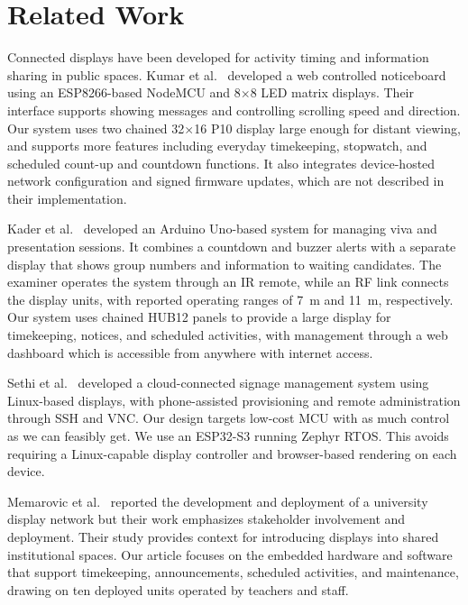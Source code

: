 \section{Related Work}
\label{sec:related_work}

Connected displays have been developed for activity timing and information sharing in public spaces. Kumar et al.~\cite{kumar2023noticeboard} developed a web controlled noticeboard using an ESP8266-based NodeMCU and 8$\times$8 LED matrix displays. Their interface supports showing messages and controlling scrolling speed and direction. Our system uses two chained 32$\times$16 P10 display large enough for distant viewing, and supports more features including everyday timekeeping, stopwatch, and scheduled count-up and countdown functions. It also integrates device-hosted network configuration and signed firmware updates, which are not described in their implementation.

Kader et al.~\cite{kader2019timing} developed an Arduino Uno-based system for managing viva and presentation sessions. It combines a countdown and buzzer alerts with a separate display that shows group numbers and information to waiting candidates. The examiner operates the system through an IR remote, while an RF link connects the display units, with reported operating ranges of 7~m and 11~m, respectively. Our system uses chained HUB12 panels to provide a large display for timekeeping, notices, and scheduled activities, with management through a web dashboard which is accessible from anywhere with internet access.

Sethi et al.~\cite{sethi2015management} developed a cloud-connected signage management system using Linux-based displays, with phone-assisted provisioning and remote administration through SSH and VNC. Our design targets low-cost MCU  with as much control as we can feasibly get. We use an ESP32-S3 running Zephyr RTOS. This avoids requiring a Linux-capable display controller and browser-based rendering on each device.

Memarovic et al.~\cite{memarovic2016networked} reported the development and deployment of a university display network but their work emphasizes stakeholder involvement and deployment. Their study provides context for introducing displays into shared institutional spaces. Our article focuses on the embedded hardware and software that support timekeeping, announcements, scheduled activities, and maintenance, drawing on ten deployed units operated by teachers and staff.

